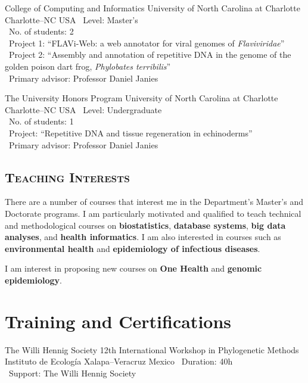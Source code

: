 \documentclass[11pt, letterpaper, sans]{moderncv}
\begin{document}
\cventry{---}
{College of Computing and Informatics}
{University of North Carolina at Charlotte}
{Charlotte--NC}
{USA}
{
	\textbullet~Level: Master's\\
	\textbullet~No. of students: 2\\
	\textbullet~Project 1: ``FLAVi-Web: a web annotator for viral genomes of \emph{Flaviviridae}''\\
	\textbullet~Project 2: ``Assembly and annotation of repetitive DNA in the genome of the golden poison dart frog, \emph{Phylobates terribilis}''\\
	\textbullet~Primary advisor: Professor Daniel Janies\\
}

\cventry{---}
{The University Honors Program}
{University of North Carolina at Charlotte}
{Charlotte--NC}
{USA}
{
	\textbullet~Level: Undergraduate\\
	\textbullet~No. of students: 1\\
	\textbullet~Project: ``Repetitive DNA and tissue regeneration in echinoderms''\\
	\textbullet~Primary advisor: Professor Daniel Janies\\
}

\vspace{.5em}
	\subsection{\textsc{Teaching Interests}}
\vspace{.5em}

There are a number of courses that interest me in the Department's Master's and Doctorate programs. I am particularly motivated and qualified to teach technical and methodological courses on \textbf{biostatistics}, \textbf{database systems}, \textbf{big data analyses}, and \textbf{health informatics}. I am also interested in courses such as \textbf{environmental health} and \textbf{epidemiology of infectious diseases}.

\vspace{0.5em}

I am interest in proposing new courses on \textbf{One Health} and \textbf{genomic epidemiology}.


\section{Training and Certifications}
		{The Willi Hennig Society 12th International Workshop in Phylogenetic Methods}
		{Instituto de Ecología}
		{Xalapa--Veracruz}
		{Mexico}
		{
			\textbullet~Duration: 40h\\
			\textbullet~Support: The Willi Hennig Society
		}
\end{document}
